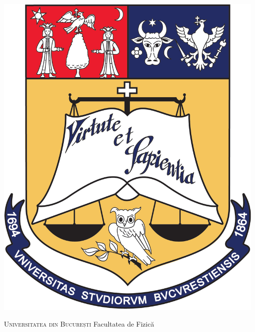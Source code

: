 \begin{titlepage}

	\centering

	\begin{minipage}[c]{0.15\textwidth}
		\centering
		\includegraphics[height=0.1\textheight]{images/logo_university.png}
	\end{minipage}
	\begin{minipage}[c]{0.6\textwidth}
		\centering
		{\Large\scshape Universitatea din București}
		{\large Facultatea de Fizică}
	\end{minipage}
	\begin{minipage}[c]{0.15\textwidth}
		\centering

\end{minipage}
\end{titlepage}
